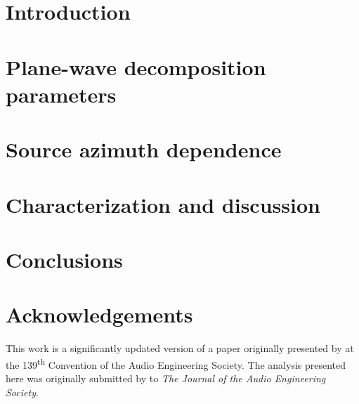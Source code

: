 \section{Introduction}\label{sec:07_Characterization_Extrapolation:Introduction}


\section{Plane-wave decomposition parameters}\label{sec:07_Characterization_Extrapolation:Plane-wave_Dependence}


\section{Source azimuth dependence}\label{sec:07_Characterization_Extrapolation:Azimuth_Dependence}


\section{Characterization and discussion}\label{sec:07_Characterization_Extrapolation:Results}


\section{Conclusions}\label{sec:07_Characterization_Extrapolation:Conclusions}


\section*{Acknowledgements}
This work is a significantly updated version of a paper originally presented by \citet{TylkaChoueiri2015} at the 139\textsuperscript{th} Convention of the Audio Engineering Society.
The analysis presented here was originally submitted by \citet{TylkaChoueiri2019c} to \textit{The Journal of the Audio Engineering Society}.